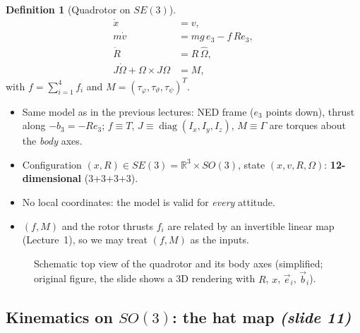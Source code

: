 \documentclass[11pt,a4paper]{article}
\newcommand{\R}{\mathbb{R}}
\newcommand{\diag}{\operatorname{diag}}
\newcommand{\hatm}[1]{\widehat{#1}}          %
\newcommand{\sli}[1]{\emph{(#1)}}
\theoremstyle{definition}
\newtheorem{definition}{Definition}[section]
\theoremstyle{plain}
\theoremstyle{remark}
\begin{document}
\begin{definition}[Quadrotor on $SE(3)$]
\begin{align*}
\dot x&=v,\\
m\dot v&=mg\,e_3-f\,Re_3,\\
\dot R&=R\,\hatm{\Omega},\\
J\dot\Omega+\Omega\times J\Omega&=M,
\end{align*}
with $f=\sum_{i=1}^4f_i$ and $M=(\tau_\varphi,\tau_\vartheta,\tau_\psi)^T$.
\end{definition}

\begin{itemize}
  \item Same model as in the previous lectures: NED frame ($e_3$ points down), thrust along $-b_3=-Re_3$; $f\equiv T$, $J\equiv\diag(I_x,I_y,I_z)$, $M\equiv\Gamma$ are torques about the \emph{body} axes.
  \item Configuration $(x,R)\in SE(3)=\R^3\times SO(3)$, state $(x,v,R,\Omega)$: \textbf{12-dimensional} (3+3+3+3).
  \item No local coordinates: the model is valid for \emph{every} attitude.
  \item $(f,M)$ and the rotor thrusts $f_i$ are related by an invertible linear map (Lecture~1), so we may treat $(f,M)$ as the inputs.
\end{itemize}

\begin{figure}[h]
\centering
{}
\caption{Schematic top view of the quadrotor and its body axes (simplified; original figure, the slide shows a 3D rendering with $R$, $x$, $\vec e_i$, $\vec b_i$).}
\end{figure}

\subsection{Kinematics on $SO(3)$: the hat map \sli{slide 11}}
\label{sec:hat}
\end{document}
